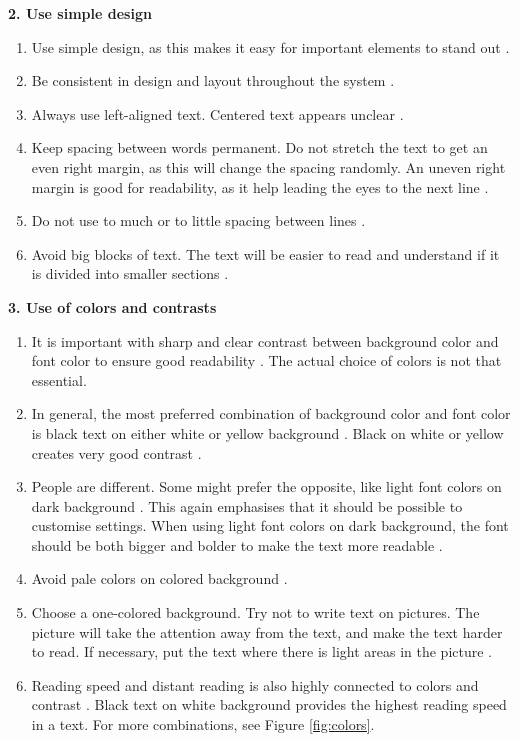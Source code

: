 \textbf{2. Use simple design}
\begin{enumerate}[{2}.a]
\item Use simple design, as this makes it easy for important elements to stand out \cite{actionforblindpeopleTekst}.
\item Be consistent in design and layout throughout the system \cite{actionforblindpeopleTekst}.
\item Always use left-aligned text. Centered text appears unclear \cite{actionforblindpeopleTekst}.  
\item Keep spacing between words permanent. Do not stretch the text to get an even right margin, as this will change the spacing randomly. An uneven right margin is good for readability, as it help leading the eyes to the next line \cite{blindeforbundetTekst} \cite{actionforblindpeopleTekst}.
\item Do not use to much or to little spacing between lines \cite{blindeforbundetTekst} \cite{actionforblindpeopleTekst}. 
\item Avoid big blocks of text. The text will be easier to read and understand if it is divided into smaller sections \cite{blindeforbundetTekst} \cite{actionforblindpeopleTekst} \cite{evengrounds}. \\  
\end{enumerate} 

\textbf{3. Use of colors and contrasts}
\begin{enumerate}[{3}.a] 
\item It is important with sharp and clear contrast between background color and font color to ensure good readability \cite{blindeforbundetTekst} \cite{actionforblindpeopleTekst}. The actual choice of colors is not that essential.   
\item In general, the most preferred combination of background color and font color is black text on either white or yellow background \cite{actionforblindpeopleTekst}. Black on white or yellow creates very good contrast \cite{blindeforbundetTekst}. 
\item People are different. Some might prefer the opposite, like light font colors on dark background \cite{blindeforbundetTekst}. This again emphasises that it should be possible to customise settings. When using light font colors on dark background, the font should be both bigger and bolder to make the text more readable \cite{actionforblindpeopleTekst}.
\item Avoid pale colors on colored background \cite{blindeforbundetTekst}.  
\item Choose a one-colored background. Try not to write text on pictures. The picture will take the attention away from the text, and make the text harder to read. If necessary, put the text where there is light areas in the picture  \cite{blindeforbundetTekst}.  
\item Reading speed and distant reading is also highly connected to colors and contrast  \cite{blindeforbundetTekst}. Black text on white background provides the highest reading speed in a text. For more combinations, see Figure \ref{fig:colors}.
\end{enumerate} 

